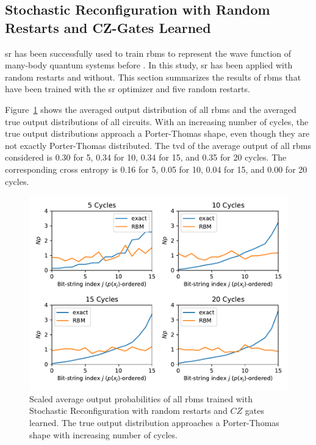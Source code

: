 \subsection{Stochastic Reconfiguration with Random Restarts and CZ-Gates Learned}

\gls{sr} has been successfully used to train \gls{rbm}s to represent the wave function 
of many-body quantum systems before \cite{carleo2017solving,medvidovic2020classical}. In this study, \gls{sr} has been applied with random restarts 
and without. 
This section summarizes the results of \gls{rbm}s that have been trained with the \gls{sr} optimizer and five random 
restarts.

Figure~\ref{fig:sr_restarts_avgPDF} shows the averaged output distribution of all \gls{rbm}s and 
the averaged true output distributions of all circuits. With an increasing number of cycles, the 
true output distributions approach a Porter-Thomas shape, even though they are not exactly Porter-Thomas 
distributed.
The \gls{tvd} of the average output of all \gls{rbm}s considered 
is 0.30 for 5, 0.34 for 10, 0.34 for 15, and 0.35 for 20 cycles. The corresponding cross entropy is 
0.16 for 5, 0.05 for 10, 0.04 for 15, and 0.00 for 20 cycles.

\begin{figure}[H]
  \centering
  \includegraphics[width=\textwidth]{figures/results/sr-restarts-learned/avgPDF.pdf}
  \caption[Scaled Average Output Probabilities of All RBMs Trained with Stochastic Reconfiguration with Random Restarts and $CZ$ Gates Learned]{
    Scaled average output probabilities of all \gls{rbm}s trained with Stochastic Reconfiguration with random restarts and $CZ$ gates learned. The true 
    output distribution approaches a Porter-Thomas shape with increasing number of cycles.}
  \label{fig:sr_restarts_avgPDF}
\end{figure}


